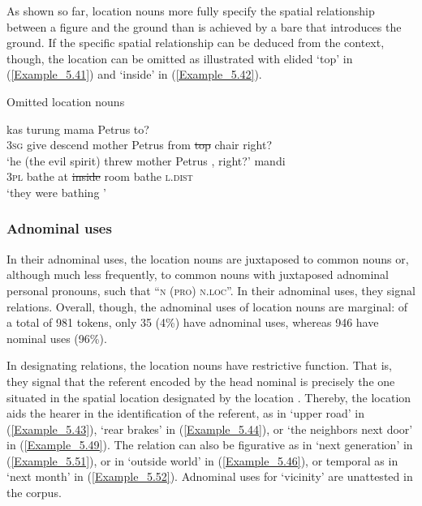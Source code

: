 As shown so far, location nouns more fully specify the spatial relationship between a figure and the ground than is achieved by a bare  that introduces the ground. If the specific spatial relationship can be deduced from the context, though, the location  can be omitted as illustrated with elided  ‘top’ in (\ref{Example_5.41}) and  ‘inside’ in (\ref{Example_5.42}).


\begin{styleExampleTitle}
Omitted location nouns
\end{styleExampleTitle}

\ea
\label{Example_5.41}
 {kas} {turung} {mama} {Petrus}    {to?}\\ %
 \textsc{3sg}  give  descend  mother  Petrus  from  \st{top}  chair  right?\\
\glt 
‘he (the evil spirit) threw mother Petrus , right?’ \textstyleExampleSource{[081025-008-Cv.0158]}
\z
\ea
\label{Example_5.42}
 {mandi} {}  {} {} {}\\ %
 \textsc{3pl}  bathe  at  \st{inside}  room  bathe  \textsc{l.dist}\\
\glt
‘they were bathing ’ \textstyleExampleSource{[081109-001-Cv.0081]}

\z

\subsubsection[Adnominal uses]{Adnominal uses}
\label{Para_5.2.3.2}
In their adnominal uses, the location nouns are juxtaposed to common nouns or, although much less frequently, to common nouns with juxtaposed adnominal personal pronouns, such that ``\textsc{n} (\textsc{pro}) \textsc{n.loc}''. In their adnominal uses, they signal  relations. Overall, though, the adnominal uses of location nouns are marginal: of a total of 981 tokens, only 35 (4\%) have adnominal uses, whereas 946 have nominal uses (96\%).



In designating  relations, the location nouns have restrictive function. That is, they signal that the referent encoded by the head nominal is precisely the one situated in the spatial location designated by the location . Thereby, the location  aids the hearer in the identification of the referent, as in  ‘upper road’ in (\ref{Example_5.43}),  ‘rear brakes’ in (\ref{Example_5.44}), or  ‘the neighbors next door’ in (\ref{Example_5.49}). The  relation can also be figurative as in  ‘next generation’ in (\ref{Example_5.51}), or in  ‘outside world’ in (\ref{Example_5.46}), or temporal as in  ‘next month’ in (\ref{Example_5.52}). Adnominal uses for  ‘vicinity’ are unattested in the corpus.


